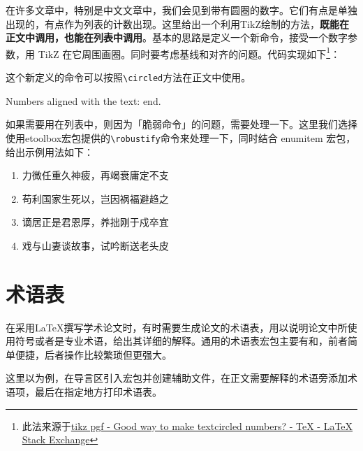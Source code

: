 在许多文章中，特别是中文文章中，我们会见到带有圆圈的数字。它们有点是单独出现的，有点作为列表的计数出现。这里给出一个利用TikZ绘制的方法，\textbf{既能在正文中调用，也能在列表中调用}。基本的思路是定义一个新命令，接受一个数字参数，用 TikZ 在它周围画圈。同时要考虑基线和对齐的问题。代码实现如下\footnote{此法来源于\href{http://tex.stackexchange.com/questions/7032/good-way-to-make-textcircled-numbers}{tikz pgf - Good way to make textcircled numbers? - TeX - LaTeX Stack Exchange}}：

\begin{latex}
\usepackage{tikz}
\usepackage{etoolbox}
\newcommand{\circled}[2][]{\tikz[baseline=(char.base)]
    {\node[shape = circle, draw, inner sep = 1pt]
        (char) {\phantom{\ifblank{#1}{#2}{#1}}};%
        \node at (char.center) {\makebox[0pt][c]{#2}};}}
\robustify{\circled}
\end{latex}

这个新定义的命令可以按照\lstinline|\circled|方法在正文中使用。

\begin{codeshow}
Numbers aligned with the text:     end.
\end{codeshow}

如果需要用在列表中，则因为「脆弱命令」的问题，需要处理一下。这里我们选择使用etoolbox宏包提供的\lstinline|\robustify|命令来处理一下，同时结合 enumitem 宏包，给出示例用法如下：

\begin{codeshow}
\begin{enumerate}[label=\dcircled{\arabic*}, noitemsep]
    \item 力微任重久神疲，再竭衰庸定不支
    \item 苟利国家生死以，岂因祸福避趋之
    \item 谪居正是君恩厚，养拙刚于戍卒宜
    \item 戏与山妻谈故事，试吟断送老头皮
\end{enumerate}
\end{codeshow}

\section{术语表}
在采用\LaTeX{}撰写学术论文时，有时需要生成论文的术语表，用以说明论文中所使用符号或者是专业术语，给出其详细的解释。通用的术语表宏包主要有和，前者简单便捷，后者操作比较繁琐但更强大。

这里以为例，在导言区引入宏包并创建辅助文件，在正文需要解释的术语旁添加术语项，最后在指定地方打印术语表。

